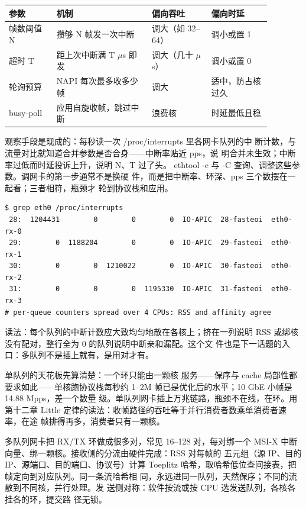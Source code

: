 \begin{longtable}{L{0.16\linewidth}L{0.32\linewidth}L{0.20\linewidth}L{0.20\linewidth}}
\toprule
参数 & 机制 & 偏向吞吐 & 偏向时延 \\
\midrule
帧数阈值 N & 攒够 N 帧发一次中断 & 调大（如 32--64） & 调小或置 1 \\
超时 T & 距上次中断满 T $\mu$s 即发 & 调大（几十 $\mu$s） & 调小或置 0 \\
轮询预算 & NAPI 每次最多收多少帧 & 调大 & 适中，防占核过久 \\
busy-poll & 应用自旋收帧，跳过中断 & 浪费核 & 时延最低且稳 \\
\bottomrule
\end{longtable}

观察手段是现成的：每秒读一次 /proc/interrupts 里各网卡队列的中
断计数，与流量对比就知道合并参数是否合身——中断率贴近 pps，说
明合并未生效；中断率过低而时延投诉上升，说明 N、T 过了头。
ethtool -c 与 -C 查询、调整这些参数。调网卡的第一步通常不是换硬
件，而是把中断率、环深、pps 三个数摆在一起看；三者相符，瓶颈才
轮到协议栈和应用。

\begin{lstlisting}
$ grep eth0 /proc/interrupts
 28:  1204431        0        0        0  IO-APIC  28-fasteoi  eth0-rx-0
 29:        0  1188204        0        0  IO-APIC  29-fasteoi  eth0-rx-1
 30:        0        0  1210022        0  IO-APIC  30-fasteoi  eth0-rx-2
 31:        0        0        0  1195330  IO-APIC  31-fasteoi  eth0-rx-3
# per-queue counters spread over 4 CPUs: RSS and affinity agree
\end{lstlisting}

读法：每个队列的中断计数应大致均匀地散在各核上；挤在一列说明
RSS 或绑核没有配对，整行全为 0 的队列说明中断亲和漏配。这个文
件也是下一话题的入口：多队列不是插上就有，是用对才有。

单队列的天花板先算清楚：一个环只能由一颗核
服务——保序与 cache 局部性都要求如此——单核跑协议栈每秒约
1--2M 帧已是优化后的水平；10 GbE 小帧是 14.88 Mpps，差一个数量
级。单队列网卡插上万兆链路，瓶颈不在线，在环。用第十二章 Little
定律的读法：收帧路径的吞吐等于并行消费者数乘单消费者速率，在途
帧排得再多，消费者只有一颗核。

多队列网卡把 RX/TX 环做成很多对，常见 16--128 对，每对绑一个
MSI-X 中断向量、绑一颗核。接收侧的分流由硬件完成：RSS 对每帧的
五元组（源 IP、目的 IP、源端口、目的端口、协议号）计算 Toeplitz
哈希，取哈希低位查间接表，把帧定向到对应队列。同一条流哈希相
同，永远进同一队列，天然保序；不同的流散到不同核，并行处理。发
送侧对称：软件按流或按 CPU 选发送队列，各核各挂各的环，提交路
径无锁。

